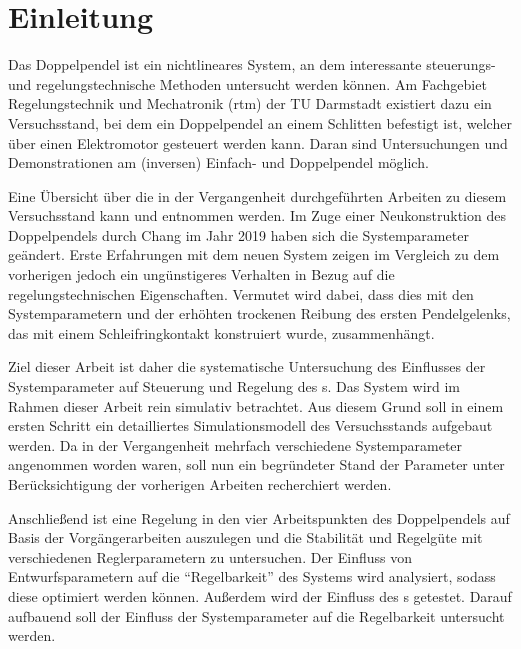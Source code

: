 \chapter{Einleitung}\label{cha:intro}

Das Doppelpendel ist ein nichtlineares System, an dem interessante steuerungs- und regelungstechnische Methoden untersucht werden können. 
Am Fachgebiet Regelungstechnik und Mechatronik (rtm) der TU Darmstadt existiert dazu ein Versuchsstand, bei dem ein Doppelpendel an einem Schlitten befestigt ist, welcher über einen Elektromotor gesteuert werden kann.
Daran sind Untersuchungen und Demonstrationen am (inversen) Einfach- und Doppelpendel möglich. 

Eine Übersicht über die in der Vergangenheit durchgeführten Arbeiten zu diesem Versuchsstand kann \cite{chang} und \cite{ribeiro} entnommen werden. Im Zuge einer Neukonstruktion des Doppelpendels durch Chang \cite{chang} im Jahr 2019 haben sich die Systemparameter geändert. Erste Erfahrungen mit dem neuen System zeigen im Vergleich zu dem vorherigen jedoch ein ungünstigeres Verhalten in Bezug auf die regelungstechnischen Eigenschaften. 
Vermutet wird dabei, dass dies mit den Systemparametern und der erhöhten trockenen Reibung des ersten Pendelgelenks, das mit einem Schleifringkontakt konstruiert wurde, zusammenhängt. 

Ziel dieser Arbeit ist daher die systematische Untersuchung des Einflusses der Systemparameter auf Steuerung und Regelung des \spds s.
Das System wird im Rahmen dieser Arbeit rein simulativ betrachtet.
Aus diesem Grund soll in einem ersten Schritt ein detailliertes Simulationsmodell des Versuchsstands aufgebaut werden. 
Da in der Vergangenheit mehrfach verschiedene Systemparameter angenommen worden waren, soll nun ein begründeter Stand der Parameter unter Berücksichtigung der vorherigen Arbeiten recherchiert werden. 

Anschließend ist eine Regelung in den vier Arbeitspunkten des Doppelpendels auf Basis der Vorgängerarbeiten auszulegen und die Stabilität und Regelgüte mit verschiedenen Reglerparametern zu untersuchen. 
Der Einfluss von Entwurfsparametern auf die "`Regelbarkeit"' des Systems wird analysiert, sodass diese optimiert werden können.
Außerdem wird der Einfluss des \beob s getestet.
Darauf aufbauend soll der Einfluss der Systemparameter auf die Regelbarkeit untersucht werden.

